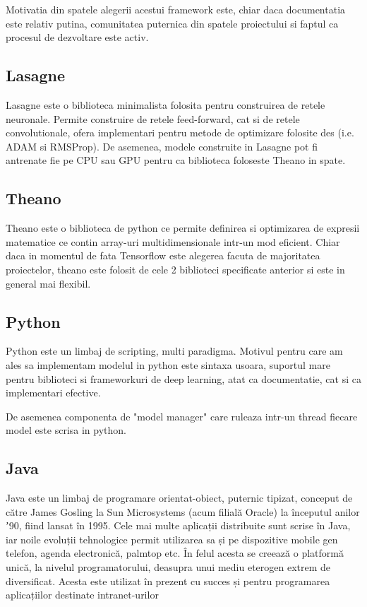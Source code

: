 \documentclass[12pt]{article}
\begin{document}
Motivatia din spatele alegerii acestui framework este, chiar daca documentatia este relativ putina, comunitatea puternica din spatele proiectului si faptul ca procesul de dezvoltare este activ.


\subsection{Lasagne}

Lasagne este o biblioteca minimalista folosita pentru construirea de retele neuronale. Permite construire de retele feed-forward, cat si de retele convolutionale, ofera implementari pentru metode de optimizare folosite des (i.e. ADAM si RMSProp). De asemenea, modele construite in Lasagne pot fi antrenate fie pe CPU sau GPU pentru ca biblioteca foloseste Theano in spate.


\subsection{Theano}

Theano este o biblioteca de python ce permite definirea si optimizarea de expresii matematice ce contin array-uri multidimensionale intr-un mod eficient. Chiar daca in momentul de fata Tensorflow este alegerea facuta de majoritatea proiectelor, theano este folosit de cele 2 biblioteci specificate anterior si este in general mai flexibil.

\subsection{Python}

Python este un limbaj de scripting, multi paradigma. Motivul pentru care am ales sa implementam modelul in python este sintaxa usoara, suportul mare pentru biblioteci si frameworkuri de deep learning, atat ca documentatie, cat si ca implementari efective. 

De asemenea componenta de "model manager" care ruleaza intr-un thread fiecare model este scrisa in python.


\subsection{Java}

Java este un limbaj de programare orientat-obiect, puternic tipizat, conceput de către James Gosling la Sun Microsystems (acum filială Oracle) la începutul anilor ʼ90, fiind lansat în 1995. Cele mai multe aplicații distribuite sunt scrise în Java, iar noile evoluții tehnologice permit utilizarea sa și pe dispozitive mobile gen telefon, agenda electronică, palmtop etc. În felul acesta se creează o platformă unică, la nivelul programatorului, deasupra unui mediu eterogen extrem de diversificat. Acesta este utilizat în prezent cu succes și pentru programarea aplicațiilor destinate intranet-urilor
\end{document}
